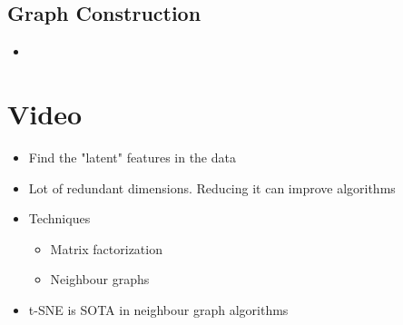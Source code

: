 \documentclass[a4paper]{article}
\begin{document}
\subsection{Graph Construction}
\begin{itemize}
    \item 
\end{itemize}
\section{Video}
\begin{itemize}
    \item Find the "latent" features in the data
    \item Lot of redundant dimensions. Reducing it can improve algorithms
    \item Techniques
        \begin{itemize}
            \item Matrix factorization
            \item Neighbour graphs
        \end{itemize}
    \item t-SNE is SOTA in neighbour graph algorithms
\end{itemize}
\end{document}
